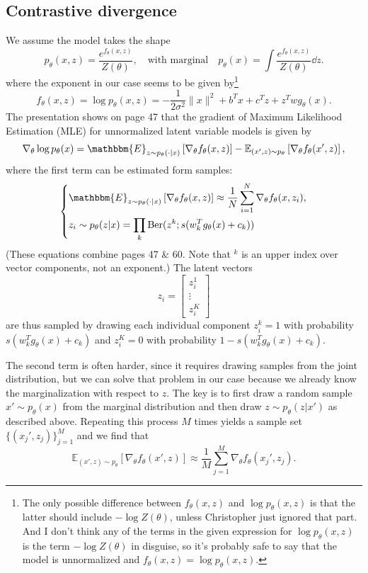 \documentclass[a4paper]{article}
\begin{document}
\subsection*{Contrastive divergence}
We assume the model takes the shape
$$p_\theta(x,z) = \frac{e^{f_\theta(x,z)}}{Z(\theta)}, \quad \text{with marginal} \quad p_\theta(x) = \int\frac{ e^{f_\theta(x,z)}}{Z(\theta)} \dd z.$$
where the exponent in our case seems to be given by\footnote{The only possible difference between $f_\theta(x,z)$ and $\log p_\theta(x,z)$ is that the latter should include $-\log Z(\theta)$, unless Christopher just ignored that part. And I don't think any of the terms in the given expression for $\log p_\theta(x,z)$ is the term $-\log Z(\theta)$ in disguise, so it's probably safe to say that the model is unnormalized and $f_\theta(x,z) = \log p_\theta(x,z)$.}
$$f_\theta(x,z) = \log p_\theta(x,z) = -\frac{1}{2\sigma^2} \|x\|^2  + b^T x + c^T z + z^T wg_\theta(x).$$
The presentation shows on page 47 that the gradient of Maximum Likelihood Estimation (MLE) for unnormalized latent variable models is given by
$$\nabla_\theta \log p_\theta(x) = \mathbbm{E}_{z \sim p_\theta(\cdot|x)} \left[ \nabla_\theta f_\theta(x,z)\right] - \mathbb{E}_{(x',z) \sim p_\theta} \left[ \nabla_\theta f_\theta(x',z)\right],$$
where the first term can be estimated form samples:
$$\left\{ \begin{aligned}
&\mathbbm{E}_{z \sim p_\theta(\cdot|x)} \left[ \nabla_\theta f_\theta(x,z)\right] \approx \frac{1}{N} \sum_{i=1}^N \nabla_\theta f_\theta(x,z_i),\\
&z_i \sim p_\theta(z|x) = \prod_k \text{Ber}(z^k; s(w_k^T g_\theta(x) + c_k))
\end{aligned}\right.$$
(These equations combine pages 47 \& 60. Note that $^k$ is an upper index over vector components, not an exponent.) The latent vectors
$$z_i = \begin{bmatrix} z_i^1\\ \vdots \\ z_i^K\end{bmatrix}$$
are thus sampled by drawing each individual component $z_i^k = 1$ with probability $s(w_k^T g_\theta(x) + c_k)$ and $z_i^K = 0$ with probability $1 - s(w_k^T g_\theta(x) + c_k)$.

The second term is often harder, since it requires drawing samples from the joint distribution, but we can solve that problem in our case because we already know the marginalization with respect to $z$. The key is to first draw a random sample $x' \sim p_\theta(x)$ from the marginal distribution and then draw $z \sim p_\theta(z|x')$ as described above. Repeating this process $M$ times yields a sample set $\{(x_j',z_j)\}_{j=1}^M$ and we find that
$$\mathbb{E}_{(x',z) \sim p_\theta} \left[ \nabla_\theta f_\theta(x',z)\right] \approx \frac{1}{M} \sum_{j=1}^M \nabla_\theta f_\theta(x_j',z_j).$$
\end{document}
